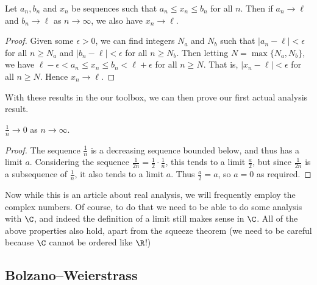 \begin{proposition}
	Let $a_n, b_n$ and $x_n$ be sequences such that $a_n \leq x_n \leq b_n$ for all $n$. Then if $a_n \rightarrow \ell$ and $b_n \rightarrow \ell$ as $n \rightarrow \infty$, we also have $x_n \rightarrow \ell$.
\end{proposition}
\begin{proof}
Given some $\epsilon > 0$, we can find integers $N_a$ and $N_b$ such that $|a_n - \ell| < \epsilon$  for all $n \geq N_a$ and $|b_n - \ell| < \epsilon$ for all $n \geq N_b$. Then letting $N = \max\{N_a, N_b\}$, we have $\ell - \epsilon < a_n \leq x_n \leq b_n < \ell + \epsilon$ for all $n \geq N$. That is, $|x_n - \ell| < \epsilon$ for all $n \geq N$. Hence $x_n \rightarrow \ell$.
\end{proof}


With these results in the our toolbox, we can then prove our first actual analysis result.

\begin{lemma}
	$\frac{1}{n} \rightarrow 0$ as $n \rightarrow \infty$.
\end{lemma}
\begin{proof}
	The sequence $\frac{1}{n}$ is a decreasing sequence bounded below, and thus has a limit $a$. Considering the sequence $\frac{1}{2n} = \frac{1}{2}\cdot \frac{1}{n}$, this tends to a limit $\frac{a}{2}$, but since $\frac{1}{2n}$ is a subsequence of $\frac{1}{n}$, it also tends to a limit $a$. Thus $\frac{a}{2}=a$, so $a = 0$ as required.
\end{proof}






Now while this is an article about real analysis, we will frequently employ the complex numbers. Of course, to do that we need to be able to do some analysis with $\C$, and indeed the definition of a limit still makes sense in $\C$. All of the above properties also hold, apart from the squeeze theorem (we need to be careful because $\C$ cannot be ordered like $\R$!)

\subsection{Bolzano–Weierstrass}

